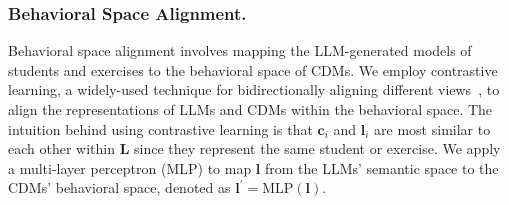 


\subsubsection{Behavioral Space Alignment.}

Behavioral space alignment involves mapping the LLM-generated models of students and exercises to the behavioral space of CDMs. 
We employ contrastive learning, a widely-used technique for bidirectionally aligning different views~\cite{khosla2020supervised,cui2023generalized}, to align the representations of LLMs and CDMs within the behavioral space.
The intuition behind using contrastive learning is that $\mathbf{c}_i$ and $\mathbf{l}_i$ are most similar to each other within $\mathbf{L}$ since they represent the same student or exercise. 
We apply a multi-layer perceptron (MLP) to map $\mathbf{l}$ from the LLMs’ semantic space to the CDMs’ behavioral space, denoted as $\mathbf{l}^\prime=\mathrm{MLP}(\mathbf{l})$.

